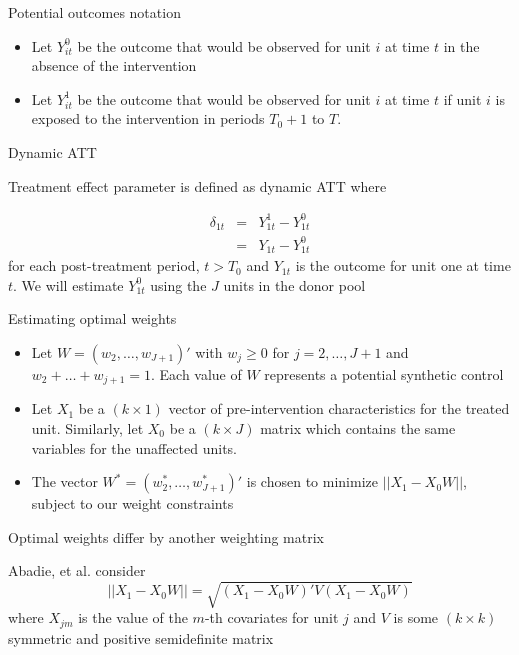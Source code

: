 \documentclass{beamer}
\begin{document}
\begin{frame}{Potential outcomes notation}

		\begin{itemize}
		\item Let $Y_{it}^0$ be the outcome that would be observed for unit $i$ at time $t$ in the absence of the intervention
		\item Let $Y_{it}^1$ be the outcome that would be observed for unit $i$ at time $t$ if unit $i$ is exposed to the intervention in periods $T_0+1$ to $T$.
		\end{itemize}

\end{frame}

\begin{frame}{Dynamic ATT}

Treatment effect parameter is defined as dynamic ATT where 

\begin{eqnarray*}
\delta_{1t}&=&Y_{1t}^1 - Y_{1t}^0 \\
&=& Y_{1t} - Y_{1t}^0 
\end{eqnarray*} for each post-treatment period, $t>T_0$ and $Y_{1t}$ is the outcome for unit one at time $t$. We will estimate $Y^0_{1t}$ using the $J$ units in the donor pool 

\end{frame}

\begin{frame}{Estimating optimal weights}
	
	\begin{itemize}
	\item Let $W=(w_2, \dots, w_{J+1})'$ with $w_j\geq 0$ for $j=2, \dots, J+1$ and $w_2+\dots+w_{j+1}=1$. Each value of $W$ represents a potential synthetic control
	\item Let $X_1$ be a $(k\times 1)$ vector of pre-intervention characteristics for the treated unit.  Similarly, let $X_0$ be a $(k\times J)$ matrix which contains the same variables for the unaffected units.
	\item The vector $W^*=(w_2^*, \dots, w_{J+1}^*)'$ is chosen to minimize $||X_1-X_0W||$, subject to our weight constraints
	\end{itemize}
\end{frame}

\begin{frame}{Optimal weights differ by another weighting matrix}
	
Abadie, et al. consider $$||X_1 - X_0W||=\sqrt{(X_1-X_0W)'V(X_1-X_0W)}$$where $X_{jm}$ is the value of the $m$-th covariates for unit $j$ and $V$ is some $(k\times k)$ symmetric and positive semidefinite matrix

\end{frame}
\end{document}
